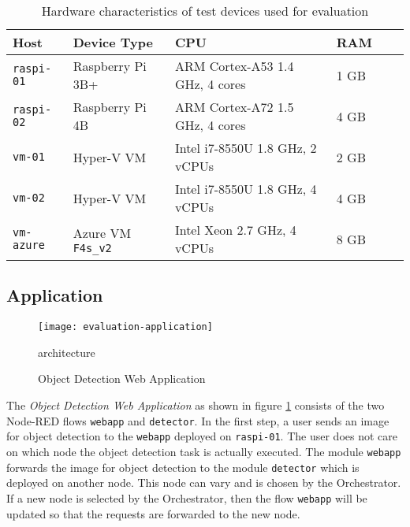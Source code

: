 \begin{table}[htb]
    \begin{tabular}{|l|l|l|l|l|l|}
    \hline
        \textbf{Host} & \textbf{Device Type} & \textbf{CPU} & \textbf{RAM} \\
         \hline
         \texttt{raspi-01} & Raspberry Pi 3B+ & ARM Cortex-A53 1.4 GHz, 4 cores & 1 GB\\
         \hline
         \texttt{raspi-02} & Raspberry Pi 4B & ARM Cortex-A72 1.5 GHz, 4 cores & 4 GB\\
         \hline
         \texttt{vm-01} & Hyper-V VM & Intel i7-8550U 1.8 GHz, 2 vCPUs & 2 GB\\
         \hline
         \texttt{vm-02} & Hyper-V VM & Intel i7-8550U 1.8 GHz, 4 vCPUs & 4 GB\\
         \hline
         \texttt{vm-azure} & Azure VM \texttt{F4s\_v2} & Intel Xeon 2.7 GHz, 4 vCPUs & 8 GB\\
         \hline
    \end{tabular}
    \caption{Hardware characteristics of test devices used for evaluation}
    \label{tab:evaluation-devices}
\end{table}

\subsection*{Application}

\begin{figure}[htb]
    \centering
    \texttt{[image: evaluation-application]}
    \caption{Object Detection Web Application} architecture
    \label{fig:evaluation-object-detection-application}
\end{figure}

The \textit{Object Detection Web Application} as shown in figure \ref{fig:evaluation-object-detection-application} consists of the two Node-RED flows \texttt{webapp} and \texttt{detector}. In the first step, a user sends an image for object detection to the \texttt{webapp} deployed on \texttt{raspi-01}. The user does not care on which node the object detection task is actually executed. The module \texttt{webapp} forwards the image for object detection to the module \texttt{detector} which is deployed on another node. This node can vary and is chosen by the Orchestrator. If a new node is selected by the Orchestrator, then the flow \texttt{webapp} will be updated so that the requests are forwarded to the new node.\\

